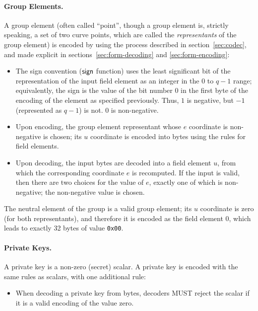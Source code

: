 \documentclass{llncs}
\newcommand{\sign}{\text{\textsf{sign}}}
\begin{document}
\paragraph{Group Elements.}
A group element (often called ``point'', though a group element is,
strictly speaking, a set of two curve points, which are called the
\emph{representants} of the group element) is encoded by using the
process described in section~\ref{sec:codec}, and made explicit in
sections~\ref{sec:form-decoding} and \ref{sec:form-encoding}:
\begin{itemize}

    \item The sign convention ($\sign$ function) uses the least
    significant bit of the representation of the input field element as
    an integer in the $0$ to $q-1$ range; equivalently, the sign is the
    value of the bit number $0$ in the first byte of the encoding of the
    element as specified previously. Thus, $1$ is negative, but $-1$
    (represented as $q-1$) is not. $0$ is non-negative.

    \item Upon encoding, the group element representant whose $e$
    coordinate is non-negative is chosen; its $u$ coordinate is encoded
    into bytes using the rules for field elements.

    \item Upon decoding, the input bytes are decoded into a field
    element $u$, from which the corresponding coordinate $e$ is
    recomputed. If the input is valid, then there are two choices for
    the value of $e$, exactly one of which is non-negative; the
    non-negative value is chosen.

\end{itemize}

The neutral element of the group is a valid group element; its $u$
coordinate is zero (for both representants), and therefore it is encoded
as the field element $0$, which leads to exactly 32 bytes of value
\verb+0x00+.

\paragraph{Private Keys.}
A private key is a non-zero (secret) scalar. A private key is encoded with
the same rules as scalars, with one additional rule:
\begin{itemize}

    \item When decoding a private key from bytes, decoders MUST reject
    the scalar if it is a valid encoding of the value zero.

\end{itemize}
\end{document}
